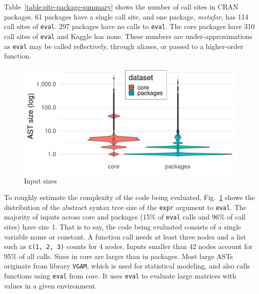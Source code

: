 \documentclass[USenglish,cleveref, autoref, thm-restate]{lipics-v2019}
\newcommand{\NbAstOnePercent}{15\%\xspace}
\newcommand{\NbAstOneCallSitePercent}{96\%\xspace}
\newcommand{\AstSizeNineFive}{42\xspace}
\newcommand{\NbCoreEvalCallSites}{310\xspace}
\newcommand{\MaxCallSitesEnrich}{114\xspace}
\newcommand{\OneCallSitesEnrich}{61\xspace}
\newcommand{\NoCallSitesEnrich}{297\xspace}
\newcommand{\eval}{\texttt{eval}\xspace}
\renewcommand{\c}[1]{\lstinline{#1}\xspace}
\begin{document}
Table~\ref{table:site-package-summary} shows the number of call sites in
CRAN packages. \OneCallSitesEnrich{} packages have a single call site, and one
package, \emph{metafor}, has \MaxCallSitesEnrich{} call sites of
\eval. \NoCallSitesEnrich{} packages have no calls to \eval. The core packages
have \NbCoreEvalCallSites{} call sites of \eval and Kaggle has none. These
numbers are under-approximations as \eval may be called reflectively,
through aliases, or passed to a higher-order function.


\begin{table}[ht]
\caption{Distribution of callsites in CRAN}
\label{table:site-package-summary}
\end{table}

\begin{figure}[!b]
	\centering
\includegraphics[width=\columnwidth]{ast_sizes}
\caption{Input sizes} \label{fig:ast-size}
\end{figure}

To roughly estimate the complexity of the code being evaluated,
Fig.~\ref{fig:ast-size} shows the distribution of the abstract syntax tree
size of the \c{expr} argument to \eval. The majority of inputs across core
and packages (\NbAstOnePercent of \eval calls and \NbAstOneCallSitePercent
of call sites) have size 1. That is to say, the code being evaluated
consists of a single variable name or constant. A function call needs at
least three nodes and a list such as \c{c(1, 2, 3)} counts for 4
nodes. Inputs smaller than \AstSizeNineFive nodes account for 95\% of all
calls. Sizes in core are larger than in packages. Most large ASTs originate
from library \c{VGAM}, which is used for statistical modeling, and also calls functions using \eval from core. It uses
\eval to evaluate large matrices with values in a given environment.
\end{document}
